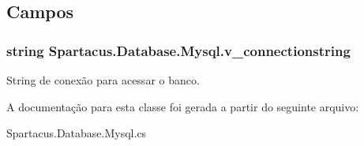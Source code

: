 \subsection{Campos}
\hypertarget{classSpartacus_1_1Database_1_1Mysql_ac29f25cd328e6bedd0b2f122040674ca}{
\subsubsection[{v\+\_\+connectionstring}]{\setlength{\rightskip}{0pt plus 5cm}string Spartacus.\+Database.\+Mysql.\+v\+\_\+connectionstring}}\label{classSpartacus_1_1Database_1_1Mysql_ac29f25cd328e6bedd0b2f122040674ca}


String de conexão para acessar o banco. 



A documentação para esta classe foi gerada a partir do seguinte arquivo\+:\begin{DoxyCompactItemize}
\item 
Spartacus.\+Database.\+Mysql.\+cs\end{DoxyCompactItemize}
